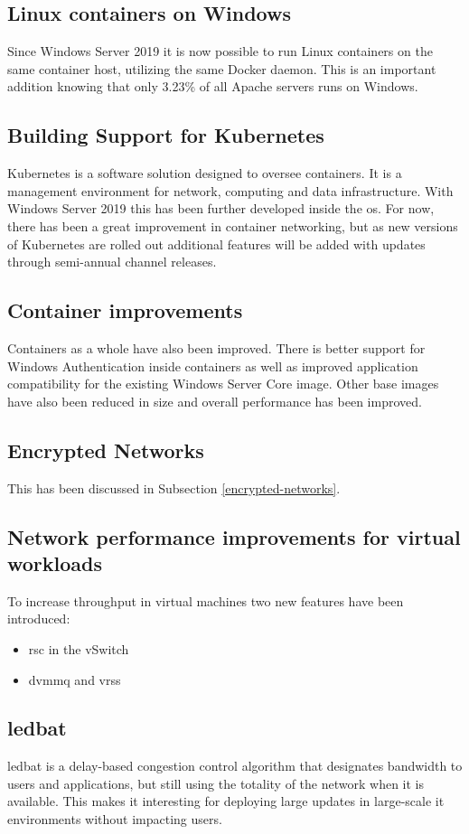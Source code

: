 \subsection*{Linux containers on Windows}
Since Windows Server 2019 it is now possible to run Linux containers on the same container host, utilizing the same Docker daemon. This is an important addition knowing that only 3.23\% of all Apache servers runs on Windows. \autocite{SecuritySpace2019}
\subsection*{Building Support for Kubernetes}
Kubernetes is a software solution designed to oversee containers. It is a management environment for network, computing and data infrastructure. With Windows Server 2019 this has been further developed inside the \acrshort{os}. For now, there has been a great improvement in container networking, but as new versions of Kubernetes are rolled out additional features will be added with updates through semi-annual channel releases.
\subsection*{Container improvements}
Containers as a whole have also been improved. There is better support for Windows Authentication inside containers as well as improved application compatibility for the existing Windows Server Core image. Other base images have also been reduced in size and overall performance has been improved.
\subsection*{Encrypted Networks}
This has been discussed in Subsection \ref{encrypted-networks}.
\subsection*{Network performance improvements for virtual workloads}
To increase throughput in virtual machines two new features have been introduced:
\begin{itemize}
	\item \acrfull{rsc} in the vSwitch
	\item \acrfull{dvmmq} and \acrfull{vrss}
\end{itemize}
\subsection*{\acrfull{ledbat}}
\acrshort{ledbat} is a delay-based congestion control algorithm that designates bandwidth to users and applications, but still using the totality of the network when it is available. \autocite{Shalunov2012}
This makes it interesting for deploying large updates in large-scale \acrshort{it} environments without impacting users.
